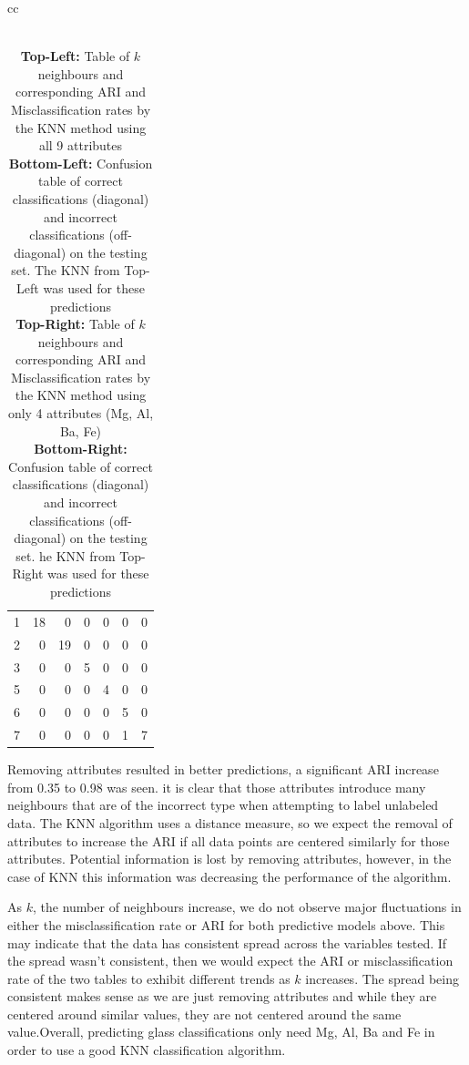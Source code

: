 \documentclass[12pt]{article}
\begin{document}
\begin{table}[ht]
{\begin{tabular}{cc}
{\begin{tabular}{rrrrrrr}
	  \hline
			1 &  18 &   0 &   0 &   0 &   0 &   0 \\ 
	  2 &   0 &  19 &   0 &   0 &   0 &   0 \\ 
	  3 &   0 &   0 &   5 &   0 &   0 &   0 \\ 
	  5 &   0 &   0 &   0 &   4 &   0 &   0 \\ 
	  6 &   0 &   0 &   0 &   0 &   5 &   0 \\ 
	  7 &   0 &   0 &   0 &   0 &   1 &   7 \\ 
	  \hline
	\end{tabular}}
\end{tabular}}
\caption{ \\
\textbf{Top-Left:} Table of $ k $ neighbours and corresponding ARI and Misclassification rates by the KNN method using all 9 attributes \\
\textbf{Bottom-Left:} Confusion table of correct classifications (diagonal) and incorrect classifications (off-diagonal) on the testing set. The KNN from Top-Left was used for these predictions \\
\textbf{Top-Right:} Table of $ k $ neighbours and corresponding ARI and Misclassification rates by the KNN method using only 4 attributes (Mg, Al, Ba, Fe) \\
\textbf{Bottom-Right:} Confusion table of correct classifications (diagonal) and incorrect classifications (off-diagonal) on the testing set. he KNN from Top-Right was used for these predictions
}
\label{t:KNN}
\end{table}

Removing attributes resulted in better predictions, a significant ARI increase from 0.35 to 0.98 was seen. it is clear that those attributes introduce many neighbours that are of the incorrect type when attempting to label unlabeled data. The KNN algorithm uses a distance measure, so we expect the removal of attributes to increase the ARI if all data points are centered similarly for those attributes. Potential information is lost by removing attributes, however, in the case of KNN this information was decreasing the performance of the algorithm.  

As $ k $, the number of neighbours increase, we do not observe major fluctuations in either the misclassification rate or ARI for both predictive models above. This may indicate that the data has consistent spread across the variables tested. If the spread wasn't consistent, then we would expect the ARI or misclassification rate of the two tables to exhibit different trends as $ k $ increases. The spread being consistent makes sense as we are just removing attributes and while they are centered around similar values, they are not centered around the same value.Overall, predicting glass classifications only need Mg, Al, Ba and Fe in order to use a good KNN classification algorithm. 
\end{document}
